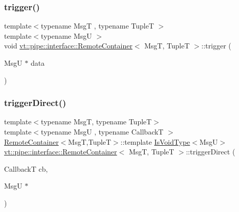 \mbox{\label{structvt_1_1pipe_1_1interface_1_1_remote_container_a1c52032c6536ca384aa0769846b01424}} 
\subsubsection{\texorpdfstring{trigger()}{trigger()}}
{\footnotesize\ttfamily template$<$typename MsgT , typename TupleT $>$ \\
template$<$typename MsgU $>$ \\
void \hyperlink{structvt_1_1pipe_1_1interface_1_1_remote_container}{vt\+::pipe\+::interface\+::\+Remote\+Container}$<$ MsgT, TupleT $>$\+::trigger (\begin{DoxyParamCaption}\item[{MsgU $\ast$}]{data }\end{DoxyParamCaption})}

\mbox{\label{structvt_1_1pipe_1_1interface_1_1_remote_container_ac109c549822ea32fe268e09d37e21822}} 
\subsubsection{\texorpdfstring{trigger\+Direct()}{triggerDirect()}\hspace{0.1cm}{\footnotesize\ttfamily [1/2]}}
{\footnotesize\ttfamily template$<$typename MsgT, typename TupleT$>$ \\
template$<$typename MsgU , typename CallbackT $>$ \\
\hyperlink{structvt_1_1pipe_1_1interface_1_1_remote_container}{Remote\+Container}$<$MsgT,TupleT$>$\+::template \hyperlink{structvt_1_1pipe_1_1interface_1_1_remote_container_a0cf5387a6b1db885a7a224bab60ce16d}{Is\+Void\+Type}$<$MsgU$>$ \hyperlink{structvt_1_1pipe_1_1interface_1_1_remote_container}{vt\+::pipe\+::interface\+::\+Remote\+Container}$<$ MsgT, TupleT $>$\+::trigger\+Direct (\begin{DoxyParamCaption}\item[{CallbackT}]{cb,  }\item[{MsgU $\ast$}]{ }\end{DoxyParamCaption})}

